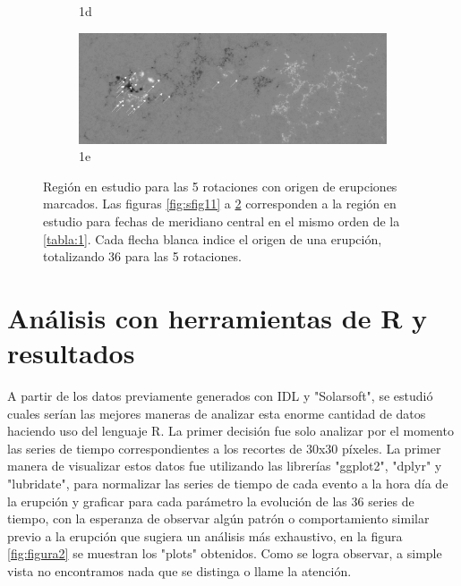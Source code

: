 \documentclass[12pt,a4paper,spanish]{article}
\begin{document}
\begin{figure}[h!]
\begin{subfigure}{.5\textwidth}
    \caption{1d}
    \label{fig:sfig14}
    \end{subfigure}
    \begin{subfigure}{.5\textwidth}
    \centering
    \includegraphics[width=.8\linewidth,scale=0.8]{Br+maskal_245_events.png}
    \caption{1e}
    \label{fig:sfig15}
    \end{subfigure}
    \caption{Región en estudio para las 5 rotaciones con origen de erupciones marcados. Las figuras \ref{fig:sfig11} a \ref{fig:sfig15} corresponden a la región en estudio para fechas de meridiano central en el mismo orden de la \ref{tabla:1}. Cada flecha blanca indice el origen de una erupción, totalizando 36 para las 5 rotaciones. }
    \label{fig:figura1}
\end{figure}

\newpage
\section{Análisis con herramientas de R y resultados}
A partir de los datos previamente generados con IDL y "Solarsoft", se estudió cuales serían las mejores maneras de analizar esta enorme cantidad de datos haciendo uso del lenguaje R. La primer decisión fue solo analizar por el momento las series de tiempo correspondientes a los recortes de 30x30 píxeles. 
La primer manera de visualizar estos datos fue utilizando las librerías "ggplot2", "dplyr" y "lubridate", para normalizar las series de tiempo de cada evento a la hora día de la erupción y graficar para cada parámetro la evolución de las 36 series de tiempo, con la esperanza de observar algún patrón o comportamiento similar previo a la erupción que sugiera un análisis más exhaustivo, en la figura \ref{fig:figura2} se muestran los "plots" obtenidos. Como se logra observar, a simple vista no encontramos nada que se distinga o llame la atención.
\end{document}
